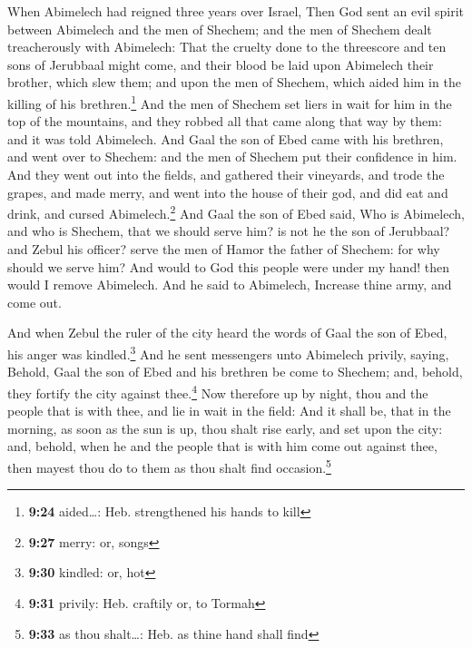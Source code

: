  When Abimelech had reigned three years over Israel,
 Then God sent an evil spirit between Abimelech and the
men of Shechem; and the men of Shechem dealt treacherously with
Abimelech:  That the cruelty done to the threescore and
ten sons of Jerubbaal might come, and their blood be laid upon Abimelech
their brother, which slew them; and upon the men of Shechem, which aided
him in the killing of his brethren.\footnote{\textbf{9:24} aided\ldots:
  Heb. strengthened his hands to kill}  And the men of
Shechem set liers in wait for him in the top of the mountains, and they
robbed all that came along that way by them: and it was told Abimelech.
 And Gaal the son of Ebed came with his brethren, and
went over to Shechem: and the men of Shechem put their confidence in
him.  And they went out into the fields, and gathered
their vineyards, and trode the grapes, and made merry, and went into the
house of their god, and did eat and drink, and cursed
Abimelech.\footnote{\textbf{9:27} merry: or, songs}  And
Gaal the son of Ebed said, Who is Abimelech, and who is Shechem, that we
should serve him? is not he the son of Jerubbaal? and Zebul his officer?
serve the men of Hamor the father of Shechem: for why should we serve
him?  And would to God this people were under my hand!
then would I remove Abimelech. And he said to Abimelech, Increase thine
army, and come out.

 And when Zebul the ruler of the city heard the words of
Gaal the son of Ebed, his anger was kindled.\footnote{\textbf{9:30}
  kindled: or, hot}  And he sent messengers unto
Abimelech privily, saying, Behold, Gaal the son of Ebed and his brethren
be come to Shechem; and, behold, they fortify the city against
thee.\footnote{\textbf{9:31} privily: Heb. craftily or, to Tormah}
 Now therefore up by night, thou and the people that is
with thee, and lie in wait in the field:  And it shall
be, that in the morning, as soon as the sun is up, thou shalt rise
early, and set upon the city: and, behold, when he and the people that
is with him come out against thee, then mayest thou do to them as thou
shalt find occasion.\footnote{\textbf{9:33} as thou shalt\ldots: Heb. as
  thine hand shall find}

